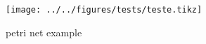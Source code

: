 


\OmegaSet

\begin{figure}[H]
  \centering
  \texttt{[image: ../../figures/tests/teste.tikz]}
  \caption{petri net example}
  \label{fig:petrinetexample}
\end{figure}

